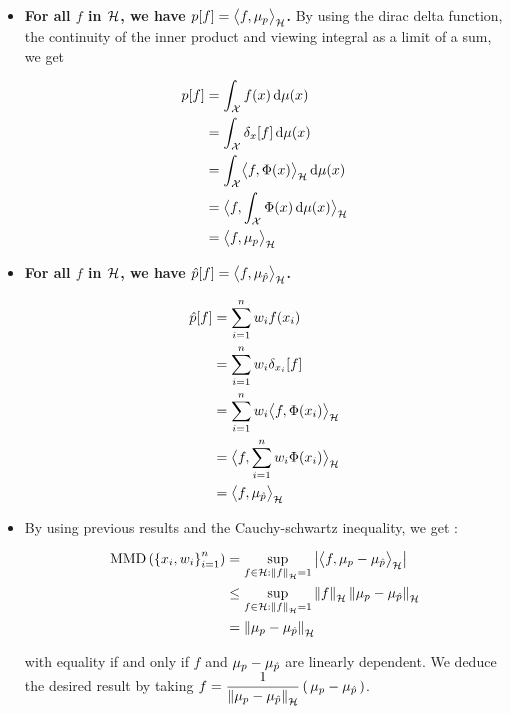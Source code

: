    \begin{itemize}[leftmargin=*, font= \color{blue} \large, label= $\bullet$]
     \item \textbf{For all $f$ in $\mathcal{H}$, we have $p[f] = \bigl \langle f , \mu_p \bigr \rangle_{\mathcal{H}}$.} By using
     the dirac delta function, the continuity of the inner product and viewing integral
     as a limit of a sum, we get
     \begin{boxcomputation}
     \begin{align*}
       p[f] &= \int_{\X} f(x) \d \mu(x)\\
       &= \int_{\X} \delta_x[f]  \d \mu(x)\\
       &= \int_{\X} \bigps{f}{\Phi(x)}  \d \mu(x)\\%
       &=  \bigps{f}{\int_{\X} \Phi(x) \d \mu(x)} \\
       &= \bigps{f}{\mu_p}
     \end{align*}
      \end{boxcomputation}
     \item \textbf{For all $f$ in $\mathcal{H}$, we have $\hat{p}[f] = \bigl \langle f , \mu_{\hat{p}} \bigr \rangle_{\mathcal{H}}$.}
     \begin{boxcomputation}
     \begin{align*}
       \p[f] &= \sum_{i=1}^n w_i f(x_i)\\
       &= \sum_{i=1}^n w_i \delta_{x_i}[f]\\
       &= \sum_{i=1}^n w_i \bigps{f}{\Phi(x_i)}\\%
       &=  \bigps{f}{\sum_{i=1}^n w_i \Phi(x_i)} \\
       &= \bigps{f}{\mu_{\p}}
     \end{align*}
   \end{boxcomputation}
\item By using previous results and the Cauchy-schwartz inequality, we get :
\begin{boxcomputation}
\begin{align*}
\MMD &= \sup _ { f \in \H : \norme{f} = 1 } \abs{
\bigps{f}{\mu_{p}-\mu_{\p}} }\\
&\leq \sup _ { f \in \H : \norme{f} = 1 } \norme{f} \norme{\mu_{p}-\mu_{\p}}\\
&= \norme{\mu_{p}-\mu_{\p}}
\end{align*}
 \end{boxcomputation}
with equality if and only if $f$ and  $\mu_{p}-\mu_{\hat{p}}$ are linearly dependent.
We deduce the desired result by taking $ \displaystyle f = \frac{1}{\norme{\mu_{p}-\mu_{\p}}}\prt{\mu_{p}-\mu_{\p}}$.

   \end{itemize}



